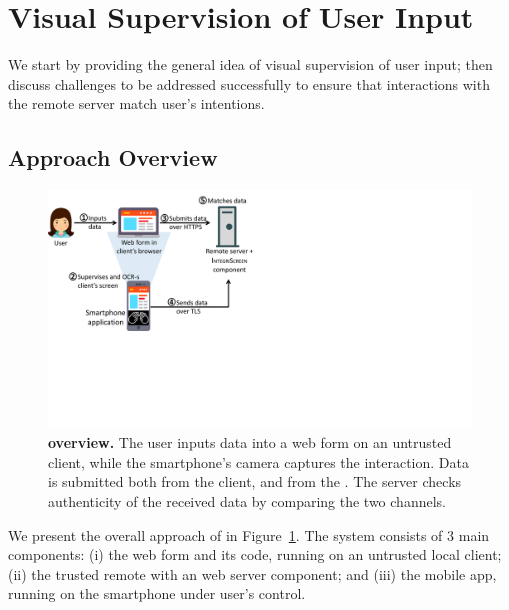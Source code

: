 \section{Visual Supervision of User Input}
\label{integriscreen:sec:systemDesign}

We start by providing the general idea of visual supervision of user input; then discuss challenges to be addressed successfully to ensure that interactions with the remote server match user's intentions.


\subsection{Approach Overview}
\label{integriscreen:sec:systemDesign:overallApproach}


\begin{figure}[t]
	\centering
	\includegraphics[trim={0 7cm 17cm 0},clip,width=0.75\linewidth]{chapters/IntegriScreen/img/systemModel.pdf}
	\caption[\sysname overview.]{\textbf{\sysname overview.}
	    \one The user inputs data into a web form on an untrusted client, \two while the smartphone's camera captures the interaction.
	    \three Data is submitted both from the client, and \four from the \app.
		\five The server checks authenticity of the received data by comparing the two channels.}
	\label{integriscreen:fig:systemModel}
\end{figure}


We present the overall approach of \sysname in Figure~\ref{integriscreen:fig:systemModel}.
The system consists of 3 main components: (i) the web form and its code, running on an untrusted local client; (ii) the trusted remote \server with an \name web server component; and (iii) the mobile app, running on the smartphone under user's control.

